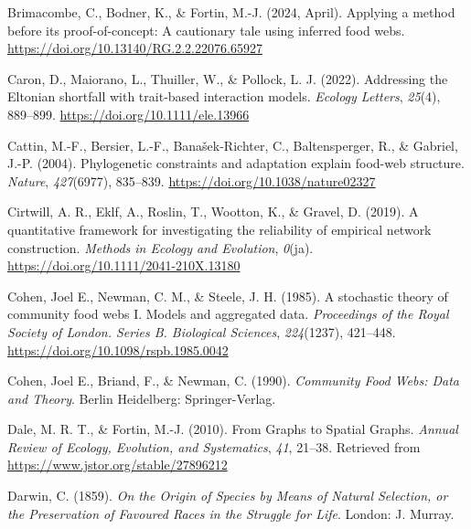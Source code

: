 \documentclass[
]{agujournal2019}
\newlength{\cslhangindent}
\newenvironment{CSLReferences}[2] %
 {\begin{list}{}{%
  \setlength{\itemindent}{0pt}
  \setlength{\leftmargin}{0pt}
  \setlength{\parsep}{0pt}
  \ifodd #1
   \setlength{\leftmargin}{\cslhangindent}
   \setlength{\itemindent}{-1\cslhangindent}
  \fi
  \setlength{\itemsep}{#2\baselineskip}}}
 {\end{list}}
\begin{document}
\begin{CSLReferences}{1}{0}
Brimacombe, C., Bodner, K., \& Fortin, M.-J. (2024, April). Applying a
method before its proof-of-concept: {A} cautionary tale using inferred
food webs. \url{https://doi.org/10.13140/RG.2.2.22076.65927}

Caron, D., Maiorano, L., Thuiller, W., \& Pollock, L. J. (2022).
Addressing the {Eltonian} shortfall with trait-based interaction models.
\emph{Ecology Letters}, \emph{25}(4), 889--899.
\url{https://doi.org/10.1111/ele.13966}

Cattin, M.-F., Bersier, L.-F., Banašek-Richter, C., Baltensperger, R.,
\& Gabriel, J.-P. (2004). Phylogenetic constraints and adaptation
explain food-web structure. \emph{Nature}, \emph{427}(6977), 835--839.
\url{https://doi.org/10.1038/nature02327}

Cirtwill, A. R., Eklf, A., Roslin, T., Wootton, K., \& Gravel, D.
(2019). A quantitative framework for investigating the reliability of
empirical network construction. \emph{Methods in Ecology and Evolution},
\emph{0}(ja). \url{https://doi.org/10.1111/2041-210X.13180}

Cohen, Joel E., Newman, C. M., \& Steele, J. H. (1985). A stochastic
theory of community food webs {I}. {Models} and aggregated data.
\emph{Proceedings of the Royal Society of London. Series B. Biological
Sciences}, \emph{224}(1237), 421--448.
\url{https://doi.org/10.1098/rspb.1985.0042}

Cohen, Joel E., Briand, F., \& Newman, C. (1990). \emph{Community {Food
Webs}: {Data} and {Theory}}. Berlin Heidelberg: Springer-Verlag.

Dale, M. R. T., \& Fortin, M.-J. (2010). From {Graphs} to {Spatial
Graphs}. \emph{Annual Review of Ecology, Evolution, and Systematics},
\emph{41}, 21--38. Retrieved from
\url{https://www.jstor.org/stable/27896212}

Darwin, C. (1859). \emph{On the {Origin} of {Species} by {Means} of
{Natural Selection}, or the {Preservation} of {Favoured Races} in the
{Struggle} for {Life}}. London: J. Murray.


\end{CSLReferences}
\end{document}
